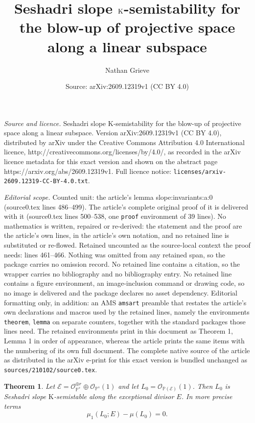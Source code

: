 \documentclass[10pt,a4paper]{amsart}
\title{Seshadri slope $\K$-semistability for the blow-up of projective space along a linear subspace}
\author{Nathan Grieve}
\date{Source: arXiv:2609.12319v1 (CC BY 4.0)}
\newtheorem{theorem}{Theorem}
\newcommand{\K}{\mathrm{K}}
\newcommand{\Osh}{{\mathcal O}}                        %
\newcommand{\PP}{\mathbb{P}} %
\begin{document}
\maketitle

\noindent\emph{Source and licence.} Seshadri slope $\K$-semistability for the blow-up of projective space along a linear subspace. Version arXiv:2609.12319v1 (CC BY 4.0), distributed by arXiv under the Creative Commons Attribution 4.0 International licence, http://creativecommons.org/licenses/by/4.0/, as recorded in the arXiv licence metadata for this exact version and shown on the abstract page https://arxiv.org/abs/2609.12319v1. Full licence notice: \texttt{licenses/arxiv-2609.12319-CC-BY-4.0.txt}.\par\smallskip

\noindent\textit{Editorial scope.} Counted unit: the article's lemma slope:invariants:a:0 (source0.tex lines 486--499). The article's complete original proof of it is delivered with it (source0.tex lines 500--538, one \texttt{proof} environment of 39 lines). No mathematics is written, repaired or re-derived: the statement and the proof are the article's own lines, in the article's own notation, and no retained line is substituted or re-flowed.  Retained uncounted as the source-local context the proof needs: lines 461--466.  Nothing was omitted from any retained span, so the package carries no omission record.  No retained line contains a citation, so the wrapper carries no bibliography and no bibliography entry.  No retained line contains a figure environment, an image-inclusion command or drawing code, so no image is delivered and the package declares no asset dependency.  Editorial formatting only, in addition: an AMS \texttt{amsart} preamble that restates the article's own declarations and macros used by the retained lines, namely the environments \texttt{theorem}, \texttt{lemma} on separate counters, together with the standard packages those lines need.  The retained environments print in this document as Theorem 1, Lemma 1 in order of appearance, whereas the article prints the same items with the numbering of its own full document.  The complete native source of the article as distributed in the arXiv e-print for this exact version is bundled unchanged as \texttt{sources/210102/source0.tex}.
\begin{theorem}\label{instability:main:thm}
Let $\mathcal{E} = \Osh_{\PP^s}^{\oplus r} \oplus \Osh_{\PP^s}(1)$ and let $L_0 = \Osh_{\PP(\mathcal{E})}(1)$.  Then $L_0$ is Seshadri slope $\K$-semistable along the exceptional divisor $E$.  In more precise terms
\begin{equation}\label{slope:stab:key:eqn}
\mu_1(L_0;E) - \mu(L_0) = 0 \text{.}
\end{equation}
\end{theorem}
\end{document}
